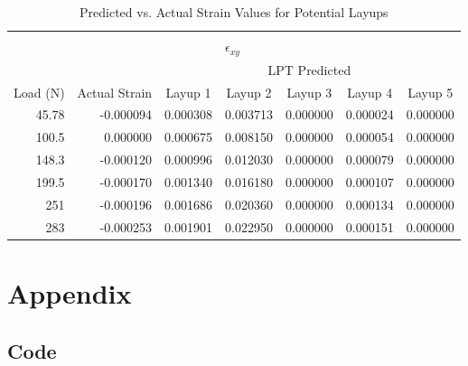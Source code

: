 \documentclass[12pt]{article}
\begin{document}
\begin{table}[htbp]
\begin{tabular}{rrrrrrr}
		&       &       &       &       &       &  \\
		&       &       & \multicolumn{1}{l}{$\epsilon_{xy}$} &       &       &  \\
		&       & \multicolumn{5}{c}{LPT Predicted} \\
		\cmidrule{3-7}    \multicolumn{1}{c}{Load (N)} & \multicolumn{1}{c}{Actual Strain} & \multicolumn{1}{c}{Layup 1} & \multicolumn{1}{c}{Layup 2} & \multicolumn{1}{c}{Layup 3} & \multicolumn{1}{c}{Layup 4} & \multicolumn{1}{c}{Layup 5} \\
		45.78 & -0.000094 & 0.000308 & 0.003713 & 0.000000 & 0.000024 & 0.000000 \\
		100.5 & 0.000000 & 0.000675 & 0.008150 & 0.000000 & 0.000054 & 0.000000 \\
		148.3 & -0.000120 & 0.000996 & 0.012030 & 0.000000 & 0.000079 & 0.000000 \\
		199.5 & -0.000170 & 0.001340 & 0.016180 & 0.000000 & 0.000107 & 0.000000 \\
		251   & -0.000196 & 0.001686 & 0.020360 & 0.000000 & 0.000134 & 0.000000 \\
		283   & -0.000253 & 0.001901 & 0.022950 & 0.000000 & 0.000151 & 0.000000 \\
	\end{tabular}%
	\caption{Predicted vs. Actual Strain Values for Potential Layups}
	\label{tab:Strains}%
\end{table}%

\section{Appendix}

\subsection{Code}
\end{document}
